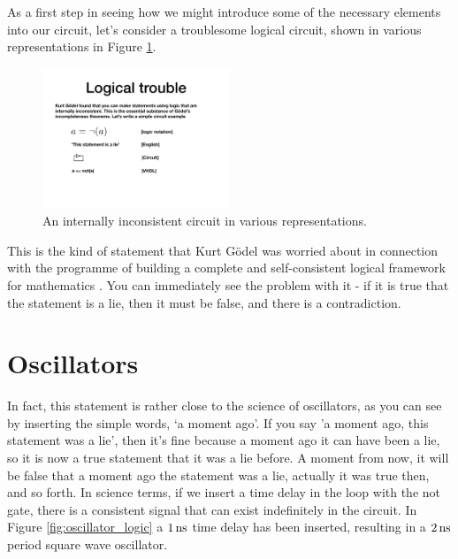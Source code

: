 \documentclass[../physical_computing.tex]{subfiles}
\begin{document}
As a first step in seeing how we might introduce some of the necessary elements into our circuit, let's consider a troublesome logical
circuit, shown in various representations in Figure 
\ref{fig:self_contradicting_logic}.

\begin{figure}[htbp]
    \centering
    \includegraphics[width=0.5\textwidth]
    {chapter_2/figures/self_contradicting_logic.pdf}
    \caption{An internally inconsistent circuit in various
    representations.}
    \label{fig:self_contradicting_logic}
\end{figure}

This is the kind of statement that Kurt G\"odel was worried about
in connection with the programme of building a complete and self-consistent logical framework for mathematics \cite{Hofstadter:99665,Smullyan}. You can 
immediately see the problem with it - if it is true that the
statement is a lie, then it must be false, and there is a 
contradiction.

\section{Oscillators}
\label{sec:oscillators}

In fact, this statement is rather close to the science of 
oscillators, as you can see by inserting the simple words,
`a moment ago'. If you say 'a moment ago, this statement was
a lie', then it's fine because a moment ago it can have been 
a lie, so it is now a true statement that it was a lie
before. A moment from now, it will be false that a moment ago
the statement was a lie, actually it was true then, and so forth.
In science terms, if we insert a time delay in the loop with 
the not gate, there is a consistent signal that can exist
indefinitely in the circuit.
In Figure \ref{fig:oscillator_logic} a $\rm 1\,ns$
time delay has been inserted, resulting in a $\rm 2\,ns$ period
square wave oscillator.
\end{document}
